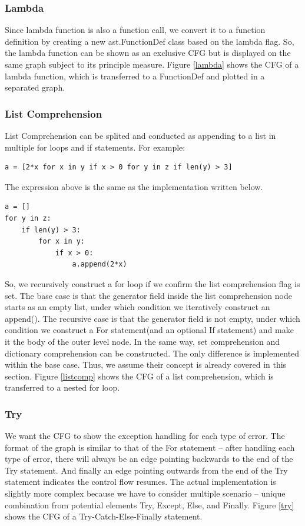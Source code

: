 \documentclass[11pt]{article}
\begin{document}
\subsubsection{Lambda}
Since lambda function is also a function call, we convert it to a function definition by creating a new ast.FunctionDef class based on the lambda flag. So, the lambda function can be shown as an exclusive CFG but is displayed on the same graph subject to its principle measure. Figure \ref{lambda} shows the CFG of a lambda function, which is transferred to a FunctionDef and plotted in a separated graph.

\subsubsection{List Comprehension}
List Comprehension can be splited and conducted as appending to a list in multiple for loops and if statements. For example:
\begin{lstlisting}
a = [2*x for x in y if x > 0 for y in z if len(y) > 3]
\end{lstlisting}
The expression above is the same as the implementation written below.
\begin{lstlisting}
a = []
for y in z:
    if len(y) > 3:
        for x in y:
            if x > 0:
                a.append(2*x)
\end{lstlisting}
So, we recursively construct a for loop if we confirm the list comprehension flag is set. The base case is that the generator field inside the list comprehension node starts as an empty list, under which condition we iteratively construct an append(). The recursive case is that the generator field is not empty, under which condition we construct a For statement(and an optional If statement) and make it the body of the outer level node. In the same way, set comprehension and dictionary comprehension can be constructed. The only difference is implemented within the base case. Thus, we assume their concept is already covered in this section. Figure \ref{listcomp} shows the CFG of a list comprehension, which is transferred to a nested for loop.

\subsubsection{Try}
We want the CFG to show the exception handling for each type of error. The format of the graph is similar to that of the For statement -- after handling each type of error, there will always be an edge pointing backwards to the end of the Try statement. And finally an edge pointing outwards from the end of the Try statement indicates the control flow resumes. The actual implementation is slightly more complex because we have to consider multiple scenario -- unique combination from potential elements Try, Except, Else, and Finally. Figure \ref{try} shows the CFG of a Try-Catch-Else-Finally statement.
\end{document}
